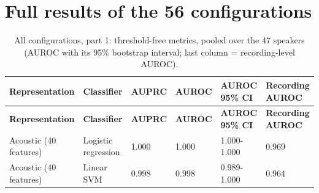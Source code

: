 \documentclass[11pt,a4paper]{article}
\begin{document}
\appendix
\section{Full results of the 56 configurations}\label{sec:app-full}
\begin{center}\small\renewcommand{\arraystretch}{1.15}
\begin{longtable}{>{\raggedright\arraybackslash}p{4.40cm}>{\raggedright\arraybackslash}p{2.60cm}>{\raggedleft\arraybackslash}p{1.75cm}>{\raggedleft\arraybackslash}p{1.75cm}>{\raggedleft\arraybackslash}p{1.75cm}>{\raggedleft\arraybackslash}p{1.75cm}}
\caption{All configurations, part 1: threshold-free metrics, pooled over the 47 speakers (AUROC with its 95\% bootstrap interval; last column = recording-level AUROC).}\\
\toprule
\textbf{\hspace{0pt}Representation} & \textbf{\hspace{0pt}Classifier} & \textbf{\hspace{0pt}AUPRC} & \textbf{\hspace{0pt}AUROC} & \textbf{\hspace{0pt}AUROC 95\% CI} & \textbf{\hspace{0pt}Recording AUROC}\\\midrule\endfirsthead
\toprule
\textbf{\hspace{0pt}Representation} & \textbf{\hspace{0pt}Classifier} & \textbf{\hspace{0pt}AUPRC} & \textbf{\hspace{0pt}AUROC} & \textbf{\hspace{0pt}AUROC 95\% CI} & \textbf{\hspace{0pt}Recording AUROC}\\\midrule\endhead
\bottomrule\endfoot
\hspace{0pt}Acoustic (40 features) & \hspace{0pt}Logistic regression & \hspace{0pt}1.000 & \hspace{0pt}1.000 & \hspace{0pt}1.000-1.000 & \hspace{0pt}0.969\\
\hspace{0pt}Acoustic (40 features) & \hspace{0pt}Linear SVM & \hspace{0pt}0.998 & \hspace{0pt}0.998 & \hspace{0pt}0.989-1.000 & \hspace{0pt}0.964\\

\end{longtable}
\end{center}
\end{document}
